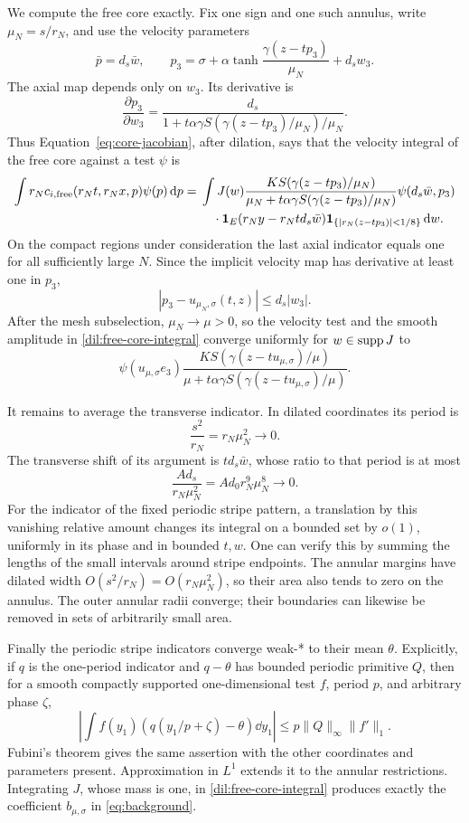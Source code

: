We compute the free core exactly. Fix one sign and one such annulus,
write \(\mu_N=s/r_N\), and use the velocity parameters
\[
\bar p=d_s\bar w,\qquad
p_3=\sigma+\alpha\tanh\frac{\gamma(z-tp_3)}{\mu_N}+d_sw_3.
\]
The axial map depends only on \(w_3\). Its derivative is
\[
\frac{\partial p_3}{\partial w_3}
=\frac{d_s}
 {1+t\alpha\gamma S(\gamma(z-tp_3)/\mu_N)/\mu_N}.
\]
Thus Equation~\eqref{eq:core-jacobian}, after dilation, says that the
velocity integral of the free core against a test \(\psi\) is
\begin{equation}\label{dil:free-core-integral}
\begin{split}
\int r_N c_{i,\mathrm{free}}(r_Nt,r_Nx,p)\psi(p)\,\mathrm d p
={}&\int J(w)
 \frac{K S(\gamma(z-tp_3)/\mu_N)}
      {\mu_N+t\alpha\gamma S(\gamma(z-tp_3)/\mu_N)}
 \psi(d_s\bar w,p_3)\\
&\quad\cdot\mathbf 1_E(r_Ny-r_Ntd_s\bar w)
 \mathbf 1_{\{|r_N(z-tp_3)|<1/8\}}\,\mathrm d w.
\end{split}
\end{equation}
On the compact regions under consideration the last axial indicator
equals one for all sufficiently large \(N\). Since the implicit
velocity map has derivative at least one in \(p_3\),
\[
|p_3-u_{\mu_N,\sigma}(t,z)|\leq d_s|w_3|.
\]
After the mesh subselection, \(\mu_N\to\mu>0\), so the velocity
test and the smooth amplitude in \eqref{dil:free-core-integral}
converge uniformly for \(w\in\operatorname{supp} J\) to
\[
\psi(u_{\mu,\sigma}e_3)
\frac{K S(\gamma(z-tu_{\mu,\sigma})/\mu)}
 {\mu+t\alpha\gamma S(\gamma(z-tu_{\mu,\sigma})/\mu)}.
\]

It remains to average the transverse indicator. In dilated coordinates
its period is
\[
\frac{s^2}{r_N}=r_N\mu_N^2\longrightarrow0.
\]
The transverse shift of its argument is \(td_s\bar w\), whose ratio
to that period is at most
\[
\frac{Ad_s}{r_N\mu_N^2}=A d_0 r_N^9\mu_N^8\longrightarrow0.
\]
For the indicator of the fixed periodic stripe pattern, a translation
by this vanishing relative amount changes its integral on a bounded
set by \(o(1)\), uniformly in its phase and in bounded \(t,w\).
One can verify this by summing the lengths of the small intervals
around stripe endpoints. The annular margins have dilated width
\(O(s^2/r_N)=O(r_N\mu_N^2)\), so their area also tends to zero on
the annulus. The outer annular radii converge; their boundaries can
likewise be removed in sets of arbitrarily small area.

Finally the periodic stripe indicators converge weak-* to their mean
\(\theta\). Explicitly, if \(q\) is the one-period indicator and
\(q-\theta\) has bounded periodic primitive \(Q\), then for a smooth
compactly supported one-dimensional test \(f\), period \(p\), and
arbitrary phase \(\zeta\),
\[
\left|\int f(y_1)(q(y_1/p+\zeta)-\theta)\dd y_1\right|
\leq p\|Q\|_\infty\|f'\|_1.
\]
Fubini's theorem gives the same assertion with the other coordinates
and parameters present. Approximation in \(L^1\) extends it to the
annular restrictions. Integrating \(J\), whose mass is one, in
\eqref{dil:free-core-integral} produces exactly the coefficient
\(b_{\mu,\sigma}\) in \eqref{eq:background}.

